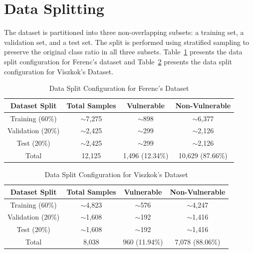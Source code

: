 \section{Data Splitting}

The dataset is partitioned into three non-overlapping subsets: a training set, a validation set, and a test set. The split is performed using stratified sampling to preserve the original class ratio in all three subsets. Table~\ref{tab:split-ferenc} presents the data split configuration for Ferenc’s dataset and Table~\ref{tab:split-viszkok} presents the data split configuration for Viszkok’s Dataset.


\begin{table}[H]
  \centering
  \caption{Data Split Configuration for Ferenc's Dataset}
  \label{tab:split-ferenc}
  \begin{tabular}{|c|c|c|c|}
    \hline
    \textbf{Dataset Split} & \textbf{Total Samples} & \textbf{Vulnerable} & \textbf{Non-Vulnerable} \\
    \hline
    Training (60\%) & $\sim$7,275 & $\sim$898 & $\sim$6,377 \\
    Validation (20\%) & $\sim$2,425 & $\sim$299 & $\sim$2,126 \\
    Test (20\%) & $\sim$2,425 & $\sim$299 & $\sim$2,126 \\
    Total & 12,125 & 1,496 (12.34\%) & 10,629 (87.66\%) \\
    \hline
  \end{tabular}
\end{table}

\begin{table}[H]
  \centering
  \caption{Data Split Configuration for Viszkok's Dataset}
  \label{tab:split-viszkok}
  \begin{tabular}{|c|c|c|c|}
    \hline
    \textbf{Dataset Split} & \textbf{Total Samples} & \textbf{Vulnerable} & \textbf{Non-Vulnerable} \\
    \hline
    Training (60\%) & $\sim$4,823 & $\sim$576 & $\sim$4,247 \\
    Validation (20\%) & $\sim$1,608 & $\sim$192 & $\sim$1,416 \\
    Test (20\%) & $\sim$1,608 & $\sim$192 & $\sim$1,416 \\
    Total & 8,038 & 960 (11.94\%) & 7,078 (88.06\%) \\
    \hline
  \end{tabular}
\end{table}

